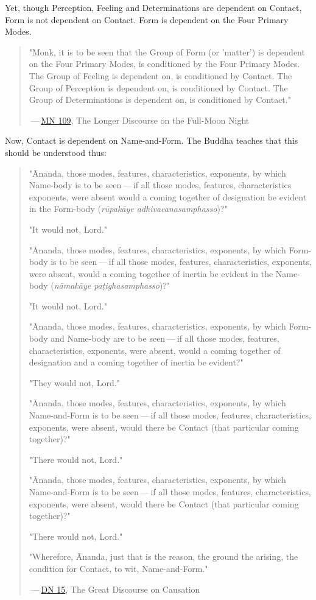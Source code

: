 Yet, though Perception, Feeling and Determinations are dependent on Contact, Form is not dependent on Contact. Form is dependent on the Four Primary Modes.

\begin{quote}
\protect\hypertarget{dependent}{}{}"Monk, it is to be seen that the Group of Form (or 'matter') is dependent on the Four Primary Modes, is conditioned by the Four Primary Modes. The Group of Feeling is dependent on, is conditioned by Contact. The Group of Perception is dependent on, is conditioned by Contact. The Group of Determinations is dependent on, is conditioned by Contact."

 --- \href{https://suttacentral.net/mn109/en/sujato}{MN 109}, The Longer Discourse on the Full-Moon Night
\end{quote}

Now, Contact is dependent on Name-and-Form. The Buddha teaches that this should be understood thus:

\begin{quote}
"Ānanda, those modes, features, characteristics, exponents, by which Name-body is to be seen --- if all those modes, features, characteristics exponents, were absent would a coming together of designation be evident in the Form-body (\emph{rūpakāye adhivacanasamphasso})?"

"It would not, Lord."

"Ānanda, those modes, features, characteristics, exponents, by which Form-body is to be seen --- if all those modes, features, characteristics, exponents, were absent, would a coming together of inertia be evident in the Name-body (\emph{nāmakāye paṭighasamphasso})?"

"It would not, Lord."

"Ānanda, those modes, features, characteristics, exponents, by which Form-body and Name-body are to be seen --- if all those modes, features, characteristics, exponents, were absent, would a coming together of designation and a coming together of inertia be evident?"

"They would not, Lord."

"Ānanda, those modes, features, characteristics, exponents, by which Name-and-Form is to be seen --- if all those modes, features, characteristics, exponents, were absent, would there be Contact (that particular coming together)?"

"There would not, Lord."

"Ānanda, those modes, features, characteristics, exponents, by which Name-and-Form is to be seen --- if all those modes, features, characteristics, exponents, were absent, would there be Contact (that particular coming together)?"

"There would not, Lord."

"Wherefore, Ānanda, just that is the reason, the ground the arising, the condition for Contact, to wit, Name-and-Form."

 --- \href{https://suttacentral.net/dn15/en/bodhi}{DN 15}, The Great Discourse on Causation
\end{quote}

